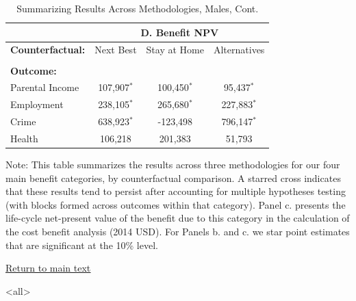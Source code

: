 \documentclass[static]{JJH-Beamer}
\begin{document}
\begin{frame}
 \addtocounter{framenumber}{-1}

\begin{table}[H]\addtocounter{table}{-1}
\caption{Summarizing Results Across Methodologies, Males, Cont.}
\begin{center}
\begin{tabular}{lccc}
\toprule
&  \multicolumn{3}{c}{\textbf{D. Benefit NPV}} \\
 \midrule
 \textbf{Counterfactual:} & Next Best & Stay at Home & Alternatives  \\ \\
 \textbf{Outcome:} & \\
Parental Income &  107,907$^*$ &  100,450$^*$ & 95,437$^*$  \\
Employment & 238,105$^*$ & 265,680$^*$ & 227,883$^*$   \\
Crime &  638,923$^*$ & -123,498 & 796,147$^*$   \\
Health &  106,218 & 201,383 & 51,793   \\
\bottomrule
\end{tabular}
\end{center}
\tiny\flushleft Note: This table summarizes the results across three methodologies for our four main benefit categories, by counterfactual comparison. A starred cross indicates that these results tend to persist after accounting for multiple hypotheses testing (with blocks formed across outcomes within that category). Panel c. presents the life-cycle net-present value of the benefit due to this category in the calculation of the cost benefit analysis (2014 USD). For Panels b. and c. we star point estimates that are significant at the 10\% level.\\
\end{table}

\end{frame}

\begin{frame}
 \addtocounter{framenumber}{-1}

\begin{center}
\hyperlink{ret:across}{\underline{Return to main text}}
\end{center}

\end{frame}


\mode<all>

\savebox\hiddenbib{\parbox{\textwidth}{}}
\end{document}

